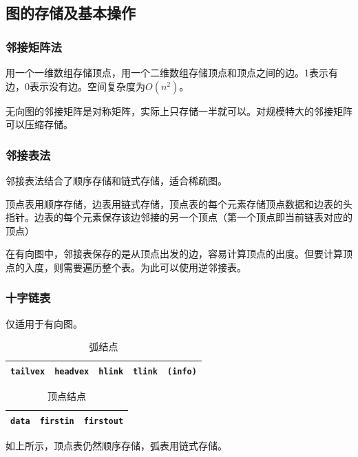 \documentclass[12pt, a4paper, oneside]{ctexart}
\begin{document}
\subsection{图的存储及基本操作}

\subsubsection{邻接矩阵法}

用一个一维数组存储顶点，用一个二维数组存储顶点和顶点之间的边。1表示有边，0表示没有边。空间复杂度为$O(n^2)$。

无向图的邻接矩阵是对称矩阵，实际上只存储一半就可以。对规模特大的邻接矩阵可以压缩存储。

\subsubsection{邻接表法}

邻接表法结合了顺序存储和链式存储，适合稀疏图。

顶点表用顺序存储，边表用链式存储，顶点表的每个元素存储顶点数据和边表的头指针。边表的每个元素保存该边邻接的另一个顶点（第一个顶点即当前链表对应的顶点）

在有向图中，邻接表保存的是从顶点出发的边，容易计算顶点的出度。但要计算顶点的入度，则需要遍历整个表。为此可以使用逆邻接表。

\subsubsection{十字链表}

仅适用于有向图。

\begin{table}[h]
  \centering
  \caption*{弧结点}
  \begin{tabular}{|c|c|c|c|c|}
    \hline
    \verb|tailvex| & \verb|headvex| & \verb|hlink| & \verb|tlink| & \verb|(info)| \\
    \hline
  \end{tabular}
\end{table}

\begin{table}[h]
  \centering
  \caption*{顶点结点}
  \begin{tabular}{|c|c|c|}
    \hline
    \verb|data| & \verb|firstin| & \verb|firstout| \\
    \hline
  \end{tabular}
\end{table}

如上所示，顶点表仍然顺序存储，弧表用链式存储。
\end{document}
